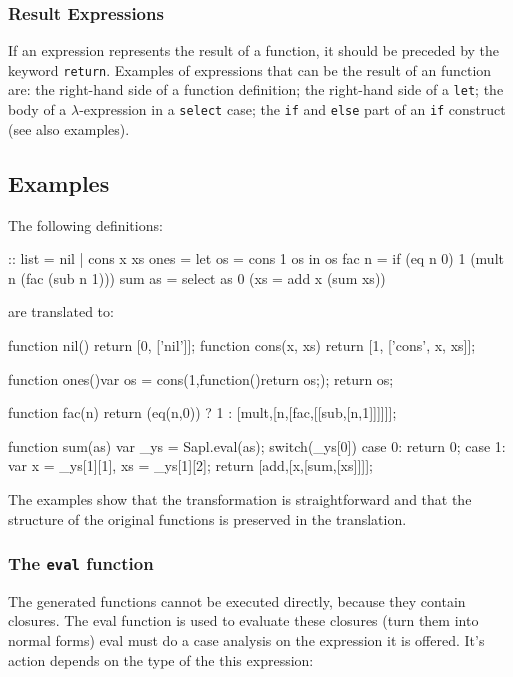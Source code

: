 \subsubsection{Result Expressions}
If an expression represents the result of a function, it should be preceded by the \JS keyword \texttt{return}.
Examples of expressions that can be the result of an function are: the right-hand side of a function definition; 
the right-hand side of a \texttt{let}; 
the body of a $\lambda$-expression in a \texttt{select} case; 
the \texttt{if} and \texttt{else} part of an \texttt{if} construct (see also examples).

\subsection{Examples}
The following \Sapl definitions:
\begin{CleanCode}
:: list = nil | cons x xs	
ones = let os = cons 1 os in os
fac n = if (eq n 0) 1 (mult n (fac (sub n 1)))
sum as = select as 0 (\x xs = add x (sum xs))
\end{CleanCode}
%
are translated to:
\begin{CleanCode}
function nil() {return [0, ['nil']];}
function cons(x, xs) {return [1, ['cons', x, xs]];}

function ones(){var os = cons(1,function(){return os;}); return os;}

function fac(n){
    return (eq(n,0)) ? 1 : [mult,[n,[fac,[[sub,[n,1]]]]]];
}

function sum(as){
	var _ys = Sapl.eval(as);
	switch(_ys[0]){
		case 0: return 0;
		case 1: var x = _ys[1][1], xs = _ys[1][2]; 
				return [add,[x,[sum,[xs]]]];
	}
}

\end{CleanCode}
The examples show that the transformation is straightforward and 
that the structure of the original functions is preserved in the translation.

\subsubsection{The \texttt{eval} function}
The generated \JS functions cannot be executed directly, because they contain closures.
The \textsf{eval} function is used to evaluate these closures (turn them into normal forms)
\textsf{eval} must do a case analysis on the expression it is offered.
It's action depends on the type of the this expression:

